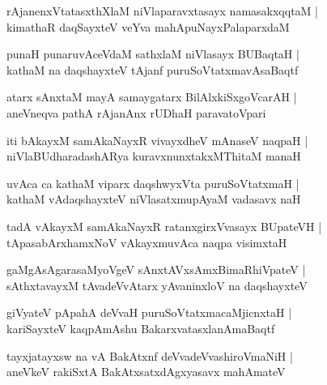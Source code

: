 \documentclass[twoside,12pt,openright]{book}
\newcounter{shloka}[chapter]
\begin{document}
\begin{shloka}%
rAjanenxVtatasxthXlaM niVlaparavxtasayx namasakxqqtaM |\\
kimathaR daqSayxteV veYva mahApuNayxPalaparxdaM 
\end{shloka}

\begin{shloka}%
punaH punaruvAceVdaM sathxlaM niVlasayx BUBaqtaH |\\
kathaM na daqshayxteV tAjanf puruSoVtatxmavAsaBaqtf
\end{shloka}

\begin{shloka}%
atarx sAnxtaM mayA samaygatarx BilAlxkiSxgoVcarAH |\\
aneVneqva pathA rAjanAnx rUDhaH paravatoVpari
\end{shloka}

\begin{shloka}%
iti bAkayxM samAkaNayxR vivayxdheV mAnaseV naqpaH |\\
niVlaBUdharadashARya kuravxnunxtakxMThitaM manaH
\end{shloka}

\begin{shloka}%
uvAca ca kathaM viparx daqshwyxVta puruSoVtatxmaH |\\
kathaM vAdaqshayxteV niVlasatxmupAyaM vadasavx naH 
\end{shloka}

\begin{shloka}%
tadA vAkayxM samAkaNayxR ratanxgirxVvasayx BUpateVH |\\
tApasabArxhamxNoV vAkayxmuvAca naqpa visimxtaH
\end{shloka}

\begin{shloka}%
gaMgAsAgarasaMyoVgeV sAnxtAVxsAmxBimaRhiVpateV |\\
sAthxtavayxM tAvadeVvAtarx yAvaninxloV na daqshayxteV 
\end{shloka}

\begin{shloka}%
giVyateV pApahA deVvaH puruSoVtatxmacaMjicnxtaH |\\
kariSayxteV kaqpAmAshu BakarxvatasxlanAmaBaqtf 
\end{shloka}

\begin{shloka}%
tayxjatayxsw na vA BakAtxnf deVvadeVvashiroVmaNiH |\\
aneVkeV rakiSxtA BakAtxsatxdAgxyasavx mahAmateV 
\end{shloka}
\end{document}
